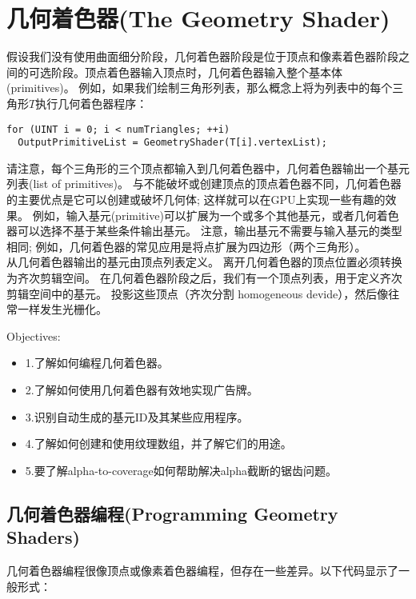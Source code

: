\chapter{几何着色器(The Geometry Shader)}
\begin{flushleft}
假设我们没有使用曲面细分阶段，几何着色器阶段是位于顶点和像素着色器阶段之间的可选阶段。顶点着色器输入顶点时，几何着色器输入整个基本体(primitives)。 例如，如果我们绘制三角形列表，那么概念上将为列表中的每个三角形$T$执行几何着色器程序：\\
\end{flushleft}

\begin{lstlisting}
for (UINT i = 0; i < numTriangles; ++i)
  OutputPrimitiveList = GeometryShader(T[i].vertexList);
\end{lstlisting}

\begin{flushleft}
请注意，每个三角形的三个顶点都输入到几何着色器中，几何着色器输出一个基元列表(list of primitives)。 与不能破坏或创建顶点的顶点着色器不同，几何着色器的主要优点是它可以创建或破坏几何体; 这样就可以在GPU上实现一些有趣的效果。 例如，输入基元(primitive)可以扩展为一个或多个其他基元，或者几何着色器可以选择不基于某些条件输出基元。 注意，输出基元不需要与输入基元的类型相同; 例如，几何着色器的常见应用是将点扩展为四边形（两个三角形）。\\

从几何着色器输出的基元由顶点列表定义。 离开几何着色器的顶点位置必须转换为齐次剪辑空间。 在几何着色器阶段之后，我们有一个顶点列表，用于定义齐次剪辑空间中的基元。 投影这些顶点（齐次分割 homogeneous devide），然后像往常一样发生光栅化。
\end{flushleft}

{\large Objectives:}
\begin{itemize}
    \item 1.了解如何编程几何着色器。
    \item 2.了解如何使用几何着色器有效地实现广告牌。
    \item 3.识别自动生成的基元ID及其某些应用程序。
    \item 4.了解如何创建和使用纹理数组，并了解它们的用途。
    \item 5.要了解alpha-to-coverage如何帮助解决alpha截断的锯齿问题。
\end{itemize}

\section{几何着色器编程(Programming Geometry Shaders)}
\begin{flushleft}
几何着色器编程很像顶点或像素着色器编程，但存在一些差异。以下代码显示了一般形式：\\
\end{flushleft}

